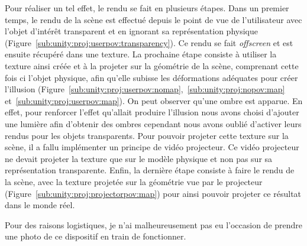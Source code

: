 Pour réaliser un tel effet, le rendu se fait en plusieurs étapes. Dans un premier temps, le rendu de la scène est effectué depuis le point de vue de l'utilisateur avec l'objet d'intérêt transparent et en ignorant sa représentation physique (Figure~\ref{sub:unity:proj:userpov:transparency}). Ce rendu se fait \emph{offscreen} et est ensuite récupéré dans une texture. La prochaine étape consiste à utiliser la texture ainsi créée et à la projeter sur la géométrie de la scène, comprenant cette fois ci l'objet physique, afin qu'elle subisse les déformations adéquates pour créer l'illusion (Figure~\ref{sub:unity:proj:userpov:nomap},~\ref{sub:unity:proj:nopov:map} et~\ref{sub:unity:proj:userpov:map}). On peut observer qu'une ombre est apparue. En effet, pour renforcer l'effet qu'allait produire l'illusion nous avons choisi d'ajouter une lumière afin d'obtenir des ombres cependant nous avons oublié d'activer leurs rendus pour les objets transparents. Pour pouvoir projeter cette texture sur la scène, il a fallu implémenter un principe de vidéo projecteur. Ce vidéo projecteur ne devait projeter la texture que sur le modèle physique et non pas sur sa représentation transparente. Enfin, la dernière étape consiste à faire le rendu de la scène, avec la texture projetée sur la géométrie vue par le projecteur (Figure~\ref{sub:unity:proj:projectorpov:map}) pour ainsi pouvoir projeter ce résultat dans le monde réel. 

Pour des raisons logistiques, je n'ai malheureusement pas eu l'occasion de prendre une photo de ce dispositif en train de fonctionner.

